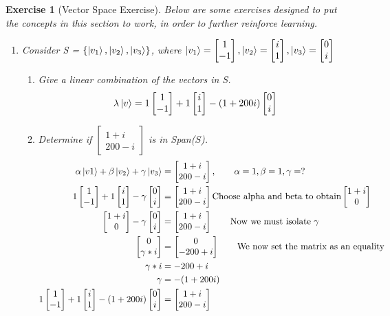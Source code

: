 \documentclass[12pt]{article}
\theoremstyle{plain}
\theoremstyle{nonumberplain}
\theoremstyle{plain}
\newtheorem{exercise}[lemma]{Exercise}
\theoremstyle{nonumberplain}
\newcommand\1{{\bf 1}}
\newcommand{\bmat}[1]{\begin{bmatrix*} #1 \end{bmatrix*}} %
\newcommand{\<}{\left\langle}
\renewcommand{\>}{\right\rangle}
\begin{document}
\begin{exercise}[Vector Space Exercise]
Below are some exercises designed to put the concepts in this section to work, in order to further reinforce learning.
\begin{enumerate}
\item Consider S = $\{\ket{v_1},\ket{v_2},\ket{v_3}\}$, where $\ket{v_1} = \bmat{1\\ -1}, \ket{v_2} = \bmat{i\\ 1}, \ket{v_3} = \bmat{0\\ i}$
	\begin{enumerate}
	\item Give a linear combination of the vectors in S.\\
	\begin{equation}
	\lambda\ket{v} = 1\bmat{1\\ -1} + 1\bmat{i\\ 1} - (1 + 200i)\bmat{0\\ i}
	\end{equation}
	\item Determine if $\bmat{1 + i\\ 200 - i}$ is in Span($S$).
	\begin{equation*}
	\begin{split}
		\alpha\ket{v1} + \beta\ket{v_2} + \gamma\ket{v_3} &= \bmat{1 + i\\ 200 - i},\qquad 	\alpha = 1, \beta = 1, \gamma = ?\\
		1\bmat{1\\ -1} + 1\bmat{i\\ 1} - \gamma\bmat{0\\ i} &= \bmat{1 + i\\ 200 - i}				\text{Choose alpha and beta to obtain} \bmat{1+i\\ 0}\\
		\bmat{1 + i\\ 0} - \gamma\bmat{0\\ i} &= \bmat{1 + i\\ 200 - i}\qquad \text{Now we must isolate $\gamma$}\\
		\bmat{0\\ \gamma*i} &= \bmat{0\\ -200 + i}\qquad \text{We now set the matrix as an equality}\\
		\gamma*i &= -200+i\\
		\gamma &= -(1 + 200i)\\
		1\bmat{1\\ -1} + 1\bmat{i\\ 1} - (1 + 200i)\bmat{0\\ i} &= \bmat{1 + i\\ 200 - i} 

\end{split}
\end{equation*}
\end{enumerate}
\end{enumerate}
\end{exercise}
\end{document}

